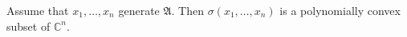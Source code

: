 
Assume that $x_1, \ldots, x_n$ generate $\mathfrak{A}$. Then $\sigma(x_1, \ldots, x_n)$ is a polynomially convex subset of $\mathbb{C}^n$.
